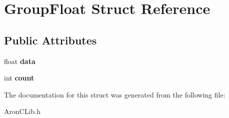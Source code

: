 \hypertarget{struct_group_float}{}\section{Group\+Float Struct Reference}
\label{struct_group_float}
\subsection*{Public Attributes}
\begin{DoxyCompactItemize}
\item 
\mbox{\label{struct_group_float_a95c1fd244347c6bda808ed6b4a6a473b}} 
float {\bfseries data}
\item 
\mbox{\label{struct_group_float_a7e2b477100ed701095afd30c8144dcf5}} 
int {\bfseries count}
\end{DoxyCompactItemize}


The documentation for this struct was generated from the following file\+:\begin{DoxyCompactItemize}
\item 
Aron\+C\+Lib.\+h\end{DoxyCompactItemize}
